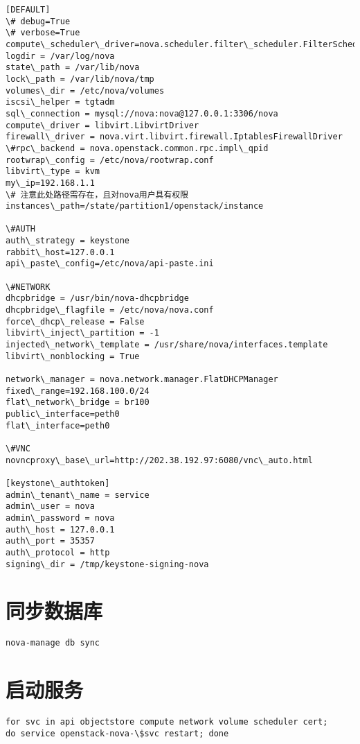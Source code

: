 \documentclass[a4paper,12pt,english]{sphinxmanual}
\begin{document}
\begin{Verbatim}[commandchars=\\\{\}]
[DEFAULT]
\# debug=True
\# verbose=True
compute\_scheduler\_driver=nova.scheduler.filter\_scheduler.FilterScheduler
logdir = /var/log/nova
state\_path = /var/lib/nova
lock\_path = /var/lib/nova/tmp
volumes\_dir = /etc/nova/volumes
iscsi\_helper = tgtadm
sql\_connection = mysql://nova:nova@127.0.0.1:3306/nova
compute\_driver = libvirt.LibvirtDriver
firewall\_driver = nova.virt.libvirt.firewall.IptablesFirewallDriver
\#rpc\_backend = nova.openstack.common.rpc.impl\_qpid
rootwrap\_config = /etc/nova/rootwrap.conf
libvirt\_type = kvm
my\_ip=192.168.1.1
\# 注意此处路径需存在，且对nova用户具有权限
instances\_path=/state/partition1/openstack/instance

\#AUTH
auth\_strategy = keystone
rabbit\_host=127.0.0.1
api\_paste\_config=/etc/nova/api-paste.ini

\#NETWORK
dhcpbridge = /usr/bin/nova-dhcpbridge
dhcpbridge\_flagfile = /etc/nova/nova.conf
force\_dhcp\_release = False
libvirt\_inject\_partition = -1
injected\_network\_template = /usr/share/nova/interfaces.template
libvirt\_nonblocking = True

network\_manager = nova.network.manager.FlatDHCPManager
fixed\_range=192.168.100.0/24
flat\_network\_bridge = br100
public\_interface=peth0
flat\_interface=peth0

\#VNC
novncproxy\_base\_url=http://202.38.192.97:6080/vnc\_auto.html

[keystone\_authtoken]
admin\_tenant\_name = service
admin\_user = nova
admin\_password = nova
auth\_host = 127.0.0.1
auth\_port = 35357
auth\_protocol = http
signing\_dir = /tmp/keystone-signing-nova
\end{Verbatim}


\section{同步数据库}
\label{nova:id5}
\begin{Verbatim}[commandchars=\\\{\}]
nova-manage db sync
\end{Verbatim}


\section{启动服务}
\label{nova:id6}
\begin{Verbatim}[commandchars=\\\{\}]
for svc in api objectstore compute network volume scheduler cert;
do service openstack-nova-\$svc restart; done
\end{Verbatim}
\end{document}
